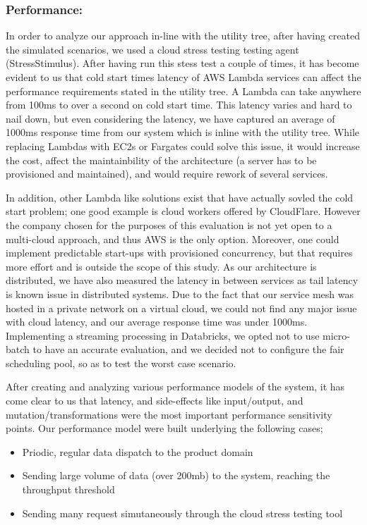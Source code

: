 \documentclass[review]{elsarticle}
\begin{document}
\subsubsection{Performance:} In order to analyze our approach in-line with the utility tree, after having created the simulated scenarios, we used a cloud stress testing testing agent (StressStimulus). After having run this stess test a couple of times, it has become evident to us that cold start times latency of AWS Lambda services can affect the performance requirements stated in the utility tree. A Lambda can take anywhere from 100ms to over a second on cold start time. This latency varies and hard to nail down, but even considering the latency, we have captured an average of 1000ms response time from our system which is inline with the utility tree. While replacing Lambdas with EC2s or Fargates could solve this issue, it would increase the cost, affect the maintainbility of the architecture (a server has to be provisioned and maintained), and would require rework of several services. 

In addition, other Lambda like solutions exist that have actually sovled the cold start problem; one good example is cloud workers offered by CloudFlare. However the company chosen for the purposes of this evaluation is not yet open to a multi-cloud approach, and thus AWS is the only option. Moreover, one could implement predictable start-ups with provisioned concurrency, but that requires more effort and is outside the scope of this study. As our architecture is distributed, we have also measured the latency in between services as tail latency is known issue in distributed systems. Due to the fact that our service mesh was hosted in a private network on a virtual cloud, we could not find any major issue with cloud latency, and our average response time was under 1000ms. Implementing a streaming processing in Databricks, we opted not to use micro-batch to have an accurate evaluation, and we decided not to configure the fair scheduling pool, so as to test the worst case scenario. 

After creating and analyzing various performance models of the system, it has come clear to us that latency, and side-effects like input/output, and mutation/transformations were the most important performance sensitivity points. Our performance model were built underlying the following cases; 

\begin{itemize}
    \item Priodic, regular data dispatch to the product domain
    \item Sending large volume of data (over 200mb) to the system, reaching the throughput threshold 
    \item Sending many request simutaneously through the cloud stress testing tool
\end{itemize}
\end{document}
